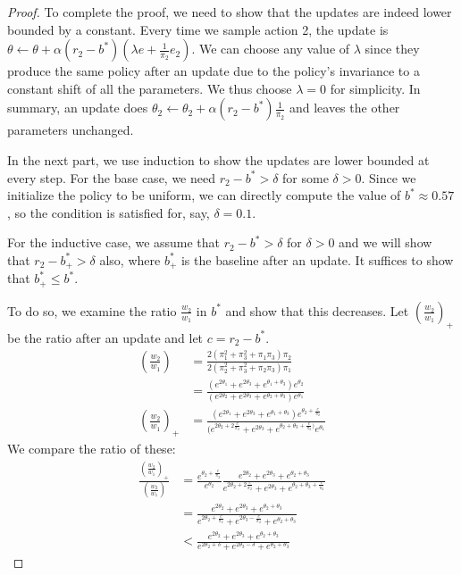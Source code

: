 \begin{proof}
To complete the proof, we need to show that the updates are indeed lower bounded by a constant.
Every time we sample action 2, the update is $\theta \xleftarrow{} \theta + \alpha (r_2 - b^*) (\lambda e + \frac{1}{\pi_2} e_2)$. We can choose any value of $\lambda$ since they produce the same policy after an update due to the policy's invariance to a constant shift of all the parameters. We thus choose $\lambda = 0$ for simplicity. 
In summary, an update does $\theta_2 \xleftarrow{} \theta_2 + \alpha (r_2 - b^*) \frac{1}{\pi_2}$ and leaves the other parameters unchanged.

In the next part, we use induction to show the updates are lower bounded at every step. 
For the base case, we need $r_2 - b^* > \delta$ for some $\delta > 0$. Since we initialize the policy to be uniform, we can directly compute the value of $b^* \approx 0.57$, so the condition is satisfied for, say, $\delta = 0.1$.

For the inductive case, we assume that $r_2 - b^* > \delta$ for $\delta > 0$ and we will show that $r_2 - b^*_+ > \delta$ also, where $b^*_+$ is the baseline after an update. 
It suffices to show that $b^*_+ \le b^*$.

To do so, we examine the ratio $\frac{w_2}{w_1}$ in $b^*$ and show that this decreases. Let $\left( \frac{w_2}{w_1}\right)_+$ be the ratio after an update and let $c = r_2 - b^*$.
\begin{align*}
    \left(\frac{w_2}{w_1}\right) &= \frac{2 (\pi_1^2 + \pi_3^2 + \pi_1 \pi_3) \pi_2}{2 (\pi_2^2 + \pi_3^2 + \pi_2 \pi_3) \pi_1 } \\
    &= \frac{( e^{2\theta_1} + e^{2\theta_3} + e^{\theta_1 + \theta_3} ) e^{\theta_2}} 
    {( e^{2\theta_2} + e^{2\theta_3} + e^{\theta_2 + \theta_3} ) e^{\theta_1}} \\
    \left(\frac{w_2}{w_1}\right)_+ &= 
    \frac{( e^{2\theta_1} + e^{2\theta_3} + e^{\theta_1 + \theta_3} ) e^{\theta_2 + \frac{c}{\pi_2}}} 
    {( e^{2\theta_2 + 2\frac{c}{\pi_2}} + e^{2\theta_3} + e^{\theta_2 + \theta_3 + \frac{c}{\pi_2} )} e^{\theta_1}}
\end{align*}
We compare the ratio of these:
\begin{align*}
    \frac{\left(\frac{w_2}{w_1}\right)_+}{\left(\frac{w_2}{w_1}\right)} &= 
    \frac{e^{\theta_2 + \frac{c}{\pi_2}}}{e^{\theta_2}} 
    \frac{e^{2\theta_2} + e^{2\theta_3} + e^{\theta_2 + \theta_3} }
    {e^{2\theta_2 + 2\frac{c}{\pi_2}} + e^{2\theta_3} + e^{\theta_2 + \theta_3 + \frac{c}{\pi_2} }} \\
    &= \frac{e^{2\theta_2} + e^{2\theta_3} + e^{\theta_2 + \theta_3}}
    {e^{2\theta_2 + \frac{c}{\pi_2}} + e^{2\theta_3 - \frac{c}{\pi_2}} + e^{\theta_2 + \theta_3 }} \\
    &< \frac{e^{2\theta_2} + e^{2\theta_3} + e^{\theta_2 + \theta_3}}
    {e^{2\theta_2 + \delta} + e^{2\theta_3 - \delta} + e^{\theta_2 + \theta_3 }} 
\end{align*}


\end{proof}
